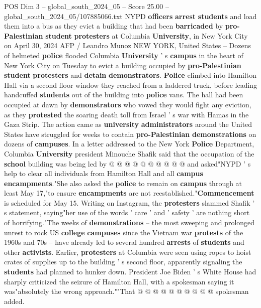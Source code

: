 \begin{textsample}{POS Dim 3 – global\_south\_2024\_05 – Score 25.00 – global\_south\_2024\_05/107885066.txt}  \label{ex:f3_pos_098}
NYPD \textbf{officers} \textbf{arrest} \textbf{students} and load them into a bus as they evict a building that had been \textbf{barricaded} by \textbf{pro-Palestinian} \textbf{student} \textbf{protesters} at Columbia \textbf{University}, in New York City on April 30, 2024 AFP / Leandro Munoz NEW YORK, United States -- Dozens of helmeted \textbf{police} flooded Columbia \textbf{University} ' s \textbf{campus} in the heart of New York City on Tuesday to evict a building occupied by \textbf{pro-Palestinian} \textbf{student} \textbf{protesters} and \textbf{detain} \textbf{demonstrators}. \textbf{Police} climbed into Hamilton Hall via a second floor window they reached from a laddered truck, before leading handcuffed \textbf{students} out of the building into \textbf{police} vans.
The hall had been occupied at dawn by \textbf{demonstrators} who vowed they would fight any eviction, as they \textbf{protested} the soaring death toll from Israel ' s war with Hamas in the Gaza Strip.
The action came as \textbf{university} \textbf{administrators} around the United States have struggled for weeks to contain \textbf{pro-Palestinian} \textbf{demonstrations} on dozens of \textbf{campuses}.
In a letter addressed to the New York \textbf{Police} Department, Columbia \textbf{University} president Minouche Shafik said that the occupation of the \textbf{school} building was being led by @ @ @ @ @ @ @ @ @ @ and asked"NYPD ' s help to clear all individuals from Hamilton Hall and all \textbf{campus} \textbf{encampments}."She also asked the \textbf{police} to remain on \textbf{campus} through at least May 17,"to ensure \textbf{encampments} are not reestablished."\textbf{Commencement} is scheduled for May 15.
Writing on Instagram, the \textbf{protesters} slammed Shafik ' s statement, saying"her use of the words ' care ' and ' safety ' are nothing short of horrifying."The weeks of \textbf{demonstrations} -- the most sweeping and prolonged unrest to rock US \textbf{college} \textbf{campuses} since the Vietnam war \textbf{protests} of the 1960s and 70s -- have already led to several hundred \textbf{arrests} of \textbf{students} and other \textbf{activists}.
Earlier, \textbf{protesters} at Columbia were seen using ropes to hoist crates of supplies up to the building ' s second floor, apparently signaling the \textbf{students} had planned to hunker down.
President Joe Biden ' s White House had sharply criticized the seizure of Hamilton Hall, with a spokesman saying it was"absolutely the wrong approach.""That @ @ @ @ @ @ @ @ @ @ spokesman added.

\end{textsample}
